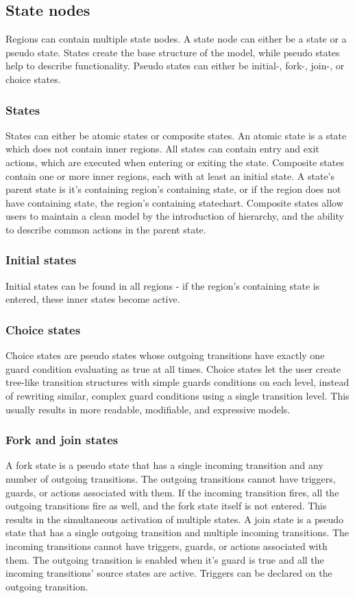   \subsection{State nodes}
Regions can contain multiple state nodes. A state node can either be a state or a pseudo state. States create the base structure of the model, while pseudo states help to describe functionality. Pseudo states can either be initial-, fork-, join-, or choice states.
    \subsubsection{States}
States can either be atomic states or composite states. An atomic state is a state which does not contain inner regions. All states can contain entry and exit actions, which are executed when entering or exiting the state. Composite states contain one or more inner regions, each with at least an initial state. A state's parent state is it's containing region's containing state, or if the region does not have containing state, the region's containing statechart. Composite states allow users to maintain a clean model by the introduction of hierarchy, and the ability to describe common actions in the parent state.
    \subsubsection{Initial states}
Initial states can be found in all regions - if the region's containing state is entered, these inner states become active.
    \subsubsection{Choice states}
Choice states are pseudo states whose outgoing transitions have exactly one guard condition evaluating as true at all times. Choice states let the user create tree-like transition structures with simple guards conditions on each level, instead of rewriting similar, complex guard conditions using a single transition level. This usually results in more readable, modifiable, and expressive models.
    \subsubsection{Fork and join states}
A fork state is a pseudo state that has a single incoming transition and any number of outgoing transitions. The outgoing transitions cannot have triggers, guards, or actions associated with them. If the incoming transition fires, all the outgoing transitions fire as well, and the fork state itself is not entered. This results in the simultaneous activation of multiple states.
A join state is a pseudo state that has a single outgoing transition and multiple incoming transitions. The incoming transitions cannot have triggers, guards, or actions associated with them. The outgoing transition is enabled when it's guard is true and all the incoming transitions' source states are active. Triggers can be declared on the outgoing transition.
